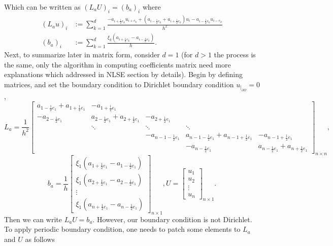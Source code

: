 Which can be written as  $(L_a U)_i = (b_a)_i$ where 
\begin{align}
	\label{def:L_a}
	(L_a u)_i &:= \sum_{k=1}^{d} \frac{-a_{i+\frac{1}{2}e_k} u_{i+e_k} + (a_{i-\frac{1}{2}e_k} + a_{i+\frac{1}{2}e_k})u_i - a_{i-\frac{1}{2}e_k} u_{i-e_k} }{h^2}\\
	\label{def:b_a}
	(b_a)_i &:= \sum_{k=1}^{d} \frac{\xi_k (a_{i+\frac{1}{2}e_k} - a_{i-\frac{1}{2}e_k})}{h} .
\end{align}
Next, to summarize later in matrix form, consider $d=1$ (for $d>1$ the process is the same, only the algorithm in computing coefficients matrix need more explanations which addressed in NLSE section by details). Begin by defining matrices, and set the boundary condition to Dirichlet boundary condition $u_{\vert_{\partial\Omega}} = 0$, 
\begin{equation*}
	L_{a} = \frac{1}{h^2}\begin{bmatrix}
		a_{1 - \frac{1}{2}e_{1}} + a_{1 + \frac{1}{2}e_{1}}  &  -a_{1+\frac{1}{2}e_{1}} &  &  &  \\
		-a_{2-\frac{1}{2}e_{1}}&a_{2 - \frac{1}{2}e_{1}} + a_{2 + \frac{1}{2}e_{1}}& -a_{2 + \frac{1}{2}e_{1}} & & \\
		& \ddots& \ddots &\ddots  &  \\
		& & -a_{n-1-\frac{1}{2}e_{1}}&a_{n-1 - \frac{1}{2}e_{1}} + a_{n-1 + \frac{1}{2}e_{1}}&-a_{n-1 + \frac{1}{2}e_{1}}\\
		& & & -a_{n-\frac{1}{2}e_{1}} &a_{n-\frac{1}{2}e_{1}} + a_{n+\frac{1}{2}e_{1}}
	\end{bmatrix}_{n \times n},
\end{equation*}
\begin{equation*}
	b_a = \frac{1}{h}\begin{bmatrix}
		\xi_1 (a_{1+\frac{1}{2}e_{1}} - a_{1-\frac{1}{2}e_{1}}) \\
		\xi_1 (a_{2+\frac{1}{2}e_{1}} - a_{2-\frac{1}{2}e_{1}}) \\
		\vdots \\
		\xi_1 (a_{n+\frac{1}{2}e_{1}} - a_{n-\frac{1}{2}e_{1}})
	\end{bmatrix}_{n \times 1},
	U = \begin{bmatrix}
		u_{1} \\
		u_{2} \\
		\vdots \\
		u_{n}
	\end{bmatrix}_{n \times 1}.
\end{equation*}
Then we can write $L_a U = b_a$. However, our boundary condition is not Dirichlet. To apply periodic boundary condition, one needs to patch some elements to $L_a$ and $U$ as follows
